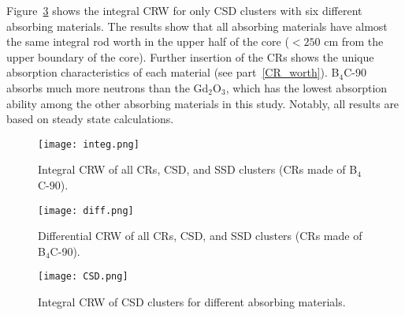 Figure~\ref{fig:CSD} shows the integral CRW for only CSD clusters with six 
different absorbing materials. The results show that all absorbing materials 
have almost the same integral rod worth in the upper half of the core 
($<250$ cm from the upper boundary of the core). Further insertion of the 
CRs shows the unique absorption characteristics of each material (see 
part~\ref{CR_worth}). B$_4$C-90 absorbs much more neutrons than the 
Gd$_2$O$_3$, which has the lowest absorption ability among the other absorbing 
materials in this study. Notably, all results are based on steady state calculations. 

\begin{figure}
	\centering
	\texttt{[image: integ.png]}
	\vspace{-0.5in}
	\caption{Integral CRW of all CRs, CSD, and SSD clusters (CRs made of B$_4$C-90).} 
	\label{fig:integ}
\end{figure}
\begin{figure}
	\centering
	\texttt{[image: diff.png]}
	\vspace{-0.5in}
	\caption{Differential CRW of all CRs, CSD, and SSD clusters (CRs made of B$_4$C-90).} 
	\label{fig:diff}
\end{figure}
\begin{figure}
	\centering
	\texttt{[image: CSD.png]}
	\vspace{-0.5in}
	\caption{Integral CRW of CSD clusters for different absorbing materials.} 
	\label{fig:CSD}
\end{figure}